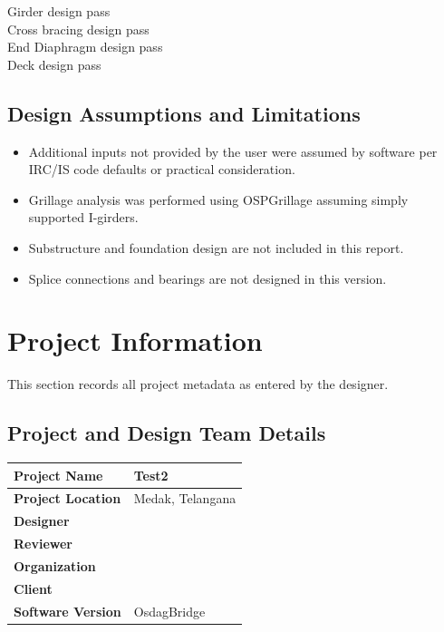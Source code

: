 \documentclass[12pt,a4paper]{report}
\numberwithin{table}{chapter}
\numberwithin{figure}{chapter}
\begin{document}
\noindent Girder design pass \\
Cross bracing design pass \\
End Diaphragm design pass \\
Deck design pass

\section*{Design Assumptions and Limitations}
\label{sec:assumptions}

\begin{itemize}
\item Additional inputs not provided by the user were assumed by software per IRC/IS code defaults or practical consideration.
\item Grillage analysis was performed using OSPGrillage assuming simply supported I-girders.
\item Substructure and foundation design are not included in this report.
\item Splice connections and bearings are not designed in this version.
\end{itemize}

\titleformat{\chapter}[block]{\normalfont\Large\bfseries\centering}{\thechapter}{1em}{}
\titlespacing*{\chapter}{0pt}{-30pt}{10pt}


\chapter{Project Information}

This section records all project metadata as entered by the designer.

\section{Project and Design Team Details}
\label{sec:project-details}

\begin{tabular}{|L{5.5cm}|L{8.5cm}|}
\hline
\textbf{Project Name} & Test2 \\
\hline
\textbf{Project Location} & Medak, Telangana \\
\hline
\textbf{Designer} &  \\
\hline
\textbf{Reviewer} &  \\
\hline
\textbf{Organization} &  \\
\hline
\textbf{Client} &  \\
\hline
\textbf{Software Version} & OsdagBridge \\
\hline
\end{tabular}
\end{document}
